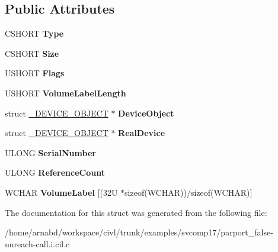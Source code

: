 \subsection*{Public Attributes}
\begin{DoxyCompactItemize}
\item 
\hypertarget{struct__VPB_a0d7a63359cdbbdeb9119fdce156a9b0e}{}C\+S\+H\+O\+R\+T {\bfseries Type}\label{struct__VPB_a0d7a63359cdbbdeb9119fdce156a9b0e}

\item 
\hypertarget{struct__VPB_a87509d009dca856f8b97b6681f574ec0}{}C\+S\+H\+O\+R\+T {\bfseries Size}\label{struct__VPB_a87509d009dca856f8b97b6681f574ec0}

\item 
\hypertarget{struct__VPB_adf591e3c6b2ff42b9344021f26bf54a6}{}U\+S\+H\+O\+R\+T {\bfseries Flags}\label{struct__VPB_adf591e3c6b2ff42b9344021f26bf54a6}

\item 
\hypertarget{struct__VPB_a1a551c42cdfd70c9d542227a932c893e}{}U\+S\+H\+O\+R\+T {\bfseries Volume\+Label\+Length}\label{struct__VPB_a1a551c42cdfd70c9d542227a932c893e}

\item 
\hypertarget{struct__VPB_aaa9f5dad9e48aba6e711ac7f0d9e82f8}{}struct \hyperlink{struct__DEVICE__OBJECT}{\+\_\+\+D\+E\+V\+I\+C\+E\+\_\+\+O\+B\+J\+E\+C\+T} $\ast$ {\bfseries Device\+Object}\label{struct__VPB_aaa9f5dad9e48aba6e711ac7f0d9e82f8}

\item 
\hypertarget{struct__VPB_af08bb9e8f49511570677c186915f9a27}{}struct \hyperlink{struct__DEVICE__OBJECT}{\+\_\+\+D\+E\+V\+I\+C\+E\+\_\+\+O\+B\+J\+E\+C\+T} $\ast$ {\bfseries Real\+Device}\label{struct__VPB_af08bb9e8f49511570677c186915f9a27}

\item 
\hypertarget{struct__VPB_aecc752a2a31e9544254b0efb5fd691ec}{}U\+L\+O\+N\+G {\bfseries Serial\+Number}\label{struct__VPB_aecc752a2a31e9544254b0efb5fd691ec}

\item 
\hypertarget{struct__VPB_ae50b4ec9aa2442de756fd826b3d33844}{}U\+L\+O\+N\+G {\bfseries Reference\+Count}\label{struct__VPB_ae50b4ec9aa2442de756fd826b3d33844}

\item 
\hypertarget{struct__VPB_a106d9797c590854759208d3c1e8d4202}{}W\+C\+H\+A\+R {\bfseries Volume\+Label} \mbox{[}(32\+U $\ast$sizeof(\+W\+C\+H\+A\+R))/sizeof(\+W\+C\+H\+A\+R)\mbox{]}\label{struct__VPB_a106d9797c590854759208d3c1e8d4202}

\end{DoxyCompactItemize}


The documentation for this struct was generated from the following file\+:\begin{DoxyCompactItemize}
\item 
/home/arnabd/workspace/civl/trunk/examples/svcomp17/parport\+\_\+false-\/unreach-\/call.\+i.\+cil.\+c\end{DoxyCompactItemize}
